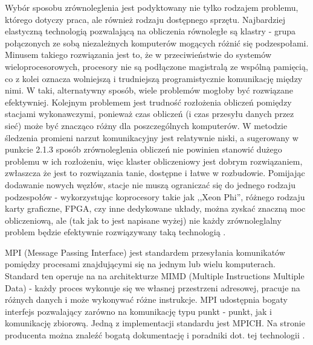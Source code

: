 Wybór sposobu zrównoleglenia jest podyktowany nie tylko rodzajem problemu, którego dotyczy praca, ale również rodzaju dostępnego sprzętu. Najbardziej elastyczną technologią pozwalającą na obliczenia równoległe są klastry - grupa połączonych ze sobą niezależnych komputerów mogących różnić się podzespołami. Minusem takiego rozwiązania jest to, że w przeciwieństwie do systemów wieloprocesorowych, procesory nie są podłączone magistralą ze wspólną pamięcią, co z kolei oznacza wolniejszą i trudniejszą programistycznie komunikację między nimi. W taki, alternatywny sposób, wiele problemów mogłoby być rozwiązane efektywniej. Kolejnym problemem jest trudność rozłożenia obliczeń pomiędzy stacjami wykonawczymi, ponieważ czas obliczeń (i czas przesyłu danych przez sieć) może być znacząco różny dla poszczególnych komputerów. W metodzie śledzenia promieni narzut komunikacyjny jest relatywnie niski, a sugerowany w punkcie 2.1.3 sposób zrównoleglenia obliczeń nie powinien stanowić dużego problemu w ich rozłożeniu, więc klaster obliczeniowy jest dobrym rozwiązaniem, zwłaszcza że jest to rozwiązania tanie, dostępne i łatwe w rozbudowie. Pomijając dodawanie nowych węzłów, stacje nie muszą ograniczać się do jednego rodzaju podzespołów - wykorzystując koprocesory takie jak ,,Xeon Phi'', różnego rodzaju karty graficzne, FPGA, czy inne dedykowane układy, można zyskać znaczną moc obliczeniową, ale (tak jak to jest napisane wyżej) nie każdy zrównoleglalny problem będzie efektywnie rozwiązywany taką technologią \cite{wikiPar}. 

MPI (Message Passing Interface) jest standardem przesyłania komunikatów pomiędzy procesami znajdującymi się na jednym lub wielu komputerach. Standard ten operuje na na architekturze MIMD (Multiple Instructions Multiple Data) - każdy proces wykonuje się we własnej przestrzeni adresowej, pracuje na różnych danych i może wykonywać różne instrukcje. MPI udostępnia bogaty interfejs pozwalający zarówno na komunikację typu punkt - punkt, jak i komunikację zbiorową. Jedną z implementacji standardu jest MPICH. Na stronie producenta można znaleźć bogatą dokumentację i poradniki dot. tej technologii \cite{mpich}. 